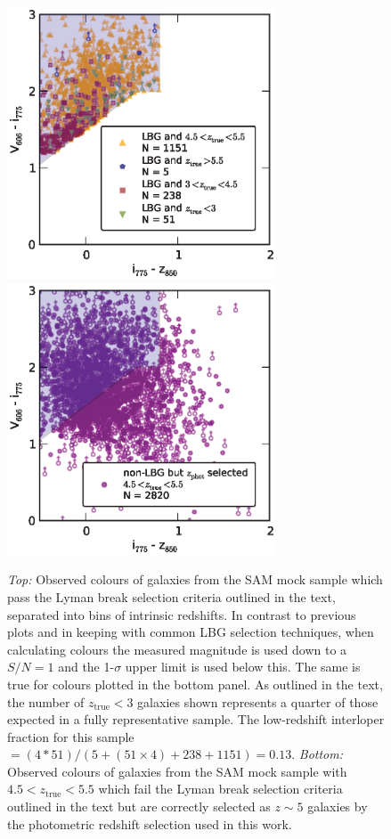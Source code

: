 \begin{figure}
\centering
\includegraphics[width=80mm]{plots/figA3a.eps}
\includegraphics[width=80mm]{plots/figA3b.eps}
\caption{\emph{Top:} Observed colours of galaxies from the SAM mock sample which pass the Lyman break selection criteria outlined in the text, separated into bins of intrinsic redshifts. In contrast to previous plots and in keeping with common LBG selection techniques, when calculating colours the measured magnitude is used down to a $S/N = 1$ and the 1-$\sigma$ upper limit is used below this. The same is true for colours plotted in the bottom panel. As outlined in the text, the number of $z_{\text{true}} < 3$ galaxies shown represents a quarter of those expected in a fully representative sample. The low-redshift interloper fraction for this sample $= (4*51) / (5 + (51 \times 4) + 238 + 1151) = 0.13$. \emph{Bottom:} Observed colours of galaxies from the SAM mock sample with $4.5 < z_{\text{true}} < 5.5$ which fail the Lyman break selection criteria outlined in the text but are correctly selected as $z\sim5$ galaxies by the photometric redshift selection used in this work.}
\label{fig:mock_col_LBG}
\end{figure}

